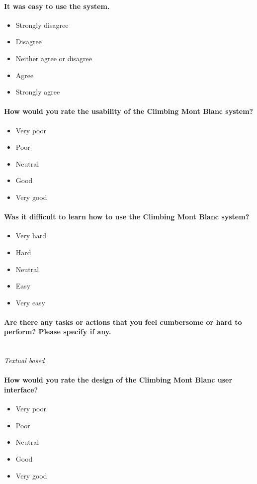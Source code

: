 \paragraph*{It was easy to use the system.} \hfill
\begin{itemize}
  \item Strongly disagree
  \item Disagree
  \item Neither agree or disagree
  \item Agree
  \item Strongly agree
\end{itemize}

\paragraph*{How would you rate the usability of the Climbing Mont Blanc system?} \hfill
\begin{itemize}
  \item Very poor
  \item Poor
  \item Neutral
  \item Good
  \item Very good
\end{itemize}

\paragraph*{Was it difficult to learn how to use the Climbing Mont Blanc system?} \hfill
\begin{itemize}
  \item Very hard
  \item Hard
  \item Neutral
  \item Easy
  \item Very easy
\end{itemize}

\paragraph*{Are there any tasks or actions that you feel cumbersome or hard to perform? Please specify if any.} \hfill \\
\textit{Textual based}

\paragraph*{How would you rate the design of the Climbing Mont Blanc user interface?} \hfill
\begin{itemize}
  \item Very poor
  \item Poor
  \item Neutral
  \item Good
  \item Very good
\end{itemize}

